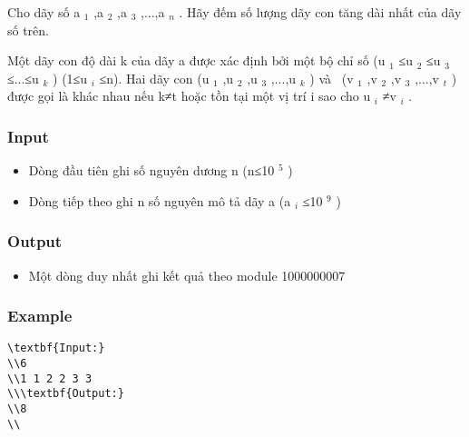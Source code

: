 



   Cho dãy số a   $_    1   $   ,a   $_    2   $   ,a   $_    3   $   ,...,a   $_    n   $   .  Hãy đếm số lượng dãy con tăng dài nhất của dãy số trên.  

   Một dãy  con độ dài k của dãy a được xác định bởi một bộ chỉ số (u   $_    1   $   ≤u   $_    2   $   ≤u   $_    3   $   ≤...≤u   $_    k   $   )  (1≤u   $_    i   $   ≤n). Hai dãy con (u   $_    1   $   ,u   $_    2   $   ,u   $_    3   $   ,...,u   $_    k   $   )  và  (v   $_    1   $   ,v   $_    2   $   ,v   $_    3   $   ,...,v   $_    t   $   ) được  gọi là khác nhau nếu k≠t hoặc tồn tại một vị trí i sao cho u   $_    i   $   ≠v   $_    i   $   .  

\subsubsection{   Input  }
\begin{itemize}
	\item     Dòng đầu tiên ghi số nguyên dương n (n≤10    $^     5    $    )   
	\item     Dòng  tiếp theo ghi n số nguyên mô tả dãy a (a    $_     i    $    ≤10    $^     9    $    )   
\end{itemize}

\subsubsection{   Output  }
\begin{itemize}
	\item     Một dòng duy nhất ghi kết quả theo module 1000000007   
\end{itemize}

\subsubsection{   Example  }
\begin{verbatim}
\textbf{Input:}
\\6
\\1 1 2 2 3 3
\\\textbf{Output:}
\\8
\\\end{verbatim}